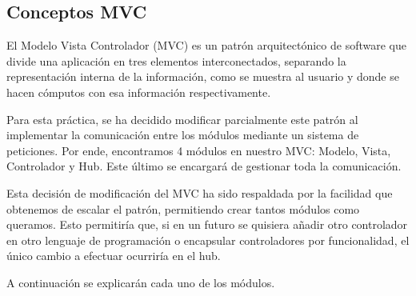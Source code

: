 \subsection{Conceptos MVC}

El Modelo Vista Controlador (MVC) es un patrón arquitectónico de software que divide una aplicación en tres elementos interconectados, separando la representación interna de la información, como se muestra al usuario y donde se hacen cómputos con esa información respectivamente. \bigskip

Para esta práctica, se ha decidido modificar parcialmente este patrón al implementar la comunicación entre los módulos mediante un sistema de peticiones. Por ende, encontramos 4 módulos en nuestro MVC: Modelo, Vista, Controlador y Hub. Este último se encargará de gestionar toda la comunicación. \bigskip

Esta decisión de modificación del MVC ha sido respaldada por la facilidad que obtenemos de escalar el patrón, permitiendo crear tantos módulos como queramos. Esto permitiría que, si en un futuro se quisiera añadir otro controlador en otro lenguaje de programación o encapsular controladores por funcionalidad, el único cambio a efectuar ocurriría en el hub.\bigskip


A continuación se explicarán cada uno de los módulos.





